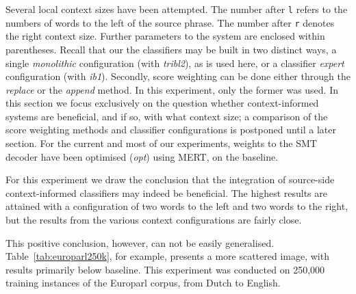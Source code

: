 \documentclass[smallextended]{svjour3}       %
\theoremstyle{break}
\begin{document}
Several local context sizes have been attempted. The number after \texttt{l}
refers to the numbers of words to the left of the source phrase. The number
after \texttt{r} denotes the right context size. Further parameters to the
system are enclosed within parentheses.  Recall that our the classifiers may be
built in two distinct ways, a single \emph{monolithic} configuration (with
\emph{tribl2}), as is used here, or a classifier \emph{expert} configuration
(with \emph{ib1}).  Secondly, score weighting can be done either through the
\emph{replace} or the \emph{append} method. In this experiment, only the former
was used.  In this section we focus exclusively on the question whether
context-informed systems are beneficial, and if so, with what context size; a
comparison of the score weighting methods and classifier configurations is
postponed until a later section.  For the current and most of our experiments,
weights to the SMT decoder have been optimised (\emph{opt}) using MERT, on the
baseline.

For this experiment we draw the conclusion that the integration of
source-side context-informed classifiers may indeed be beneficial.
The highest results are attained with a configuration of two words to
the left and two words to the right, but the results from the various
context configurations are fairly close. 

This positive conclusion, however, can not be easily generalised.
Table~\ref{tab:europarl250k}, for example, presents a more scattered image,
with results primarily below baseline. This experiment was conducted on 250,000
training instances of the Europarl corpus, from Dutch to
English.
\end{document}
